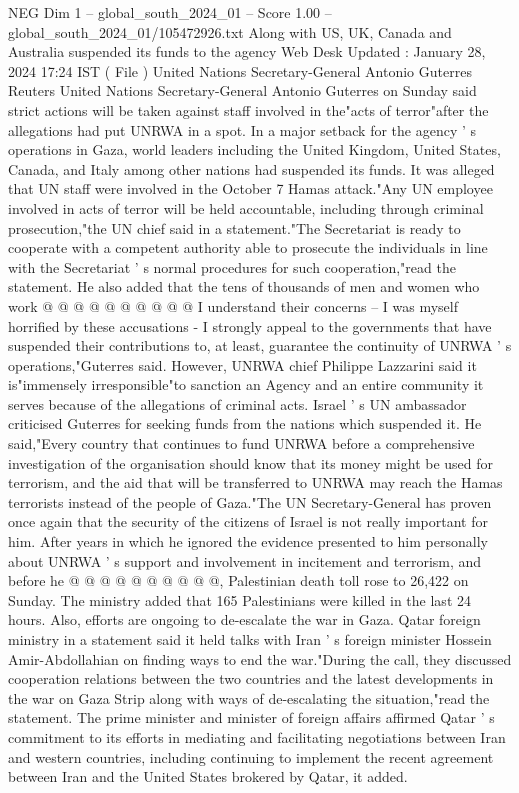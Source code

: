 \begin{textsample}{NEG Dim 1 – global\_south\_2024\_01 – Score 1.00 – global\_south\_2024\_01/105472926.txt}  \label{ex:f1_neg_353}
Along with US, UK, Canada and Australia suspended its funds to the agency Web Desk Updated : January 28, 2024 17:24 IST ( File ) United Nations Secretary-General Antonio Guterres Reuters United Nations Secretary-General Antonio Guterres on Sunday said strict actions will be taken against staff involved in the"acts of terror"after the allegations had put UNRWA in a spot.
In a major setback for the agency ' s operations in Gaza, world leaders including the United Kingdom, United States, Canada, and Italy among other nations had suspended its funds.
It was alleged that UN staff were involved in the October 7 Hamas attack."Any UN employee involved in acts of terror will be held accountable, including through criminal prosecution,"the UN chief said in a statement."The Secretariat is ready to cooperate with a competent authority able to prosecute the individuals in line with the Secretariat ' s normal procedures for such cooperation,"read the statement.
He also added that the tens of thousands of men and women who work @ @ @ @ @ @ @ @ @ @ I understand their concerns -- I was myself horrified by these accusations - I strongly appeal to the governments that have suspended their contributions to, at least, guarantee the continuity of UNRWA ' s operations,"Guterres said.
However, UNRWA chief Philippe Lazzarini said it is"immensely irresponsible"to sanction an Agency and an entire community it serves because of the allegations of criminal acts.
Israel ' s UN ambassador criticised Guterres for seeking funds from the nations which suspended it.
He said,"Every country that continues to fund UNRWA before a comprehensive investigation of the organisation should know that its money might be used for terrorism, and the aid that will be transferred to UNRWA may reach the Hamas terrorists instead of the people of Gaza."The UN Secretary-General has proven once again that the security of the citizens of Israel is not really important for him.
After years in which he ignored the evidence presented to him personally about UNRWA ' s support and involvement in incitement and terrorism, and before he @ @ @ @ @ @ @ @ @ @, Palestinian death toll rose to 26,422 on Sunday.
The ministry added that 165 Palestinians were killed in the last 24 hours.
Also, efforts are ongoing to de-escalate the war in Gaza.
Qatar foreign ministry in a statement said it held talks with Iran ' s foreign minister Hossein Amir-Abdollahian on finding ways to end the war."During the call, they discussed cooperation relations between the two countries and the latest developments in the war on Gaza Strip along with ways of de-escalating the situation,"read the statement.
The prime minister and minister of foreign affairs affirmed Qatar ' s commitment to its efforts in mediating and facilitating negotiations between Iran and western countries, including continuing to implement the recent agreement between Iran and the United States brokered by Qatar, it added.

\end{textsample}
